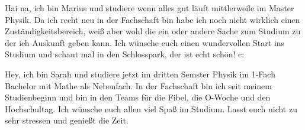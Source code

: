 \begin{multicols}{2}
{
Hai na, ich bin Marius und studiere wenn alles gut läuft mittlerweile im Master Physik. Da ich recht neu in der Fachschaft bin habe ich noch nicht wirklich einen Zuständigkeitsbereich, weiß aber wohl die ein oder andere Sache zum Studium zu der ich Auskunft geben kann. Ich wünsche euch einen wundervollen Start ins Studium und schaut mal in den Schlosspark, der ist echt schön! c:
}

\vspace{-0.18cm}

{
Hey, ich bin Sarah und studiere jetzt im dritten Semster Physik im 1-Fach Bachelor mit Mathe als Nebenfach. In der Fachschaft bin ich seit meinem Studienbeginn und bin in den Teams für die Fibel, die O-Woche und den Hochschultag. 
Ich wünsche euch allen viel Spaß im Studium. Lasst euch nicht zu sehr stressen und genießt die Zeit.  
}


\end{multicols}
